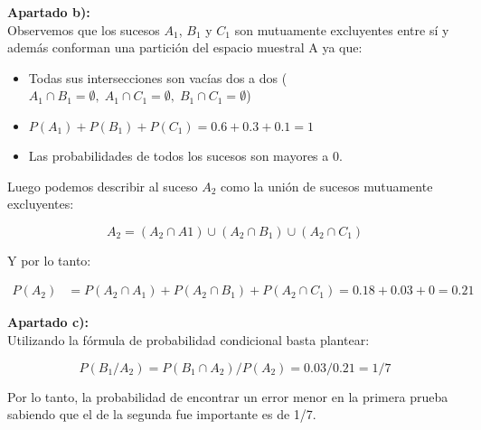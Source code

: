 \documentclass[11pt]{article}
\begin{document}
\begin{justify}
  \textbf{Apartado b):} \\
  Observemos que los sucesos $A_1$, $B_1$ y $C_1$ son mutuamente excluyentes
  entre sí y además conforman una partición del espacio muestral A ya que:
  \begin{itemize}
    \item Todas sus intersecciones son vacías dos a dos
    ($A_1 \cap B_1 = \emptyset,\;A_1 \cap C_1 = \emptyset,\;B_1 \cap C_1 = \emptyset$)
    \item $P(A_1) + P(B_1) + P(C_1) = 0.6 + 0.3 + 0.1 = 1$
    \item Las probabilidades de todos los sucesos son mayores a 0.
  \end{itemize}
  Luego podemos describir al suceso $A_2$ como la unión de sucesos mutuamente
  excluyentes:
\end{justify}
\begin{equation*}
  A_2 = (A_2 \cap A1) \cup (A_2 \cap B_1) \cup (A_2 \cap C_1)
\end{equation*}
\begin{justify}
  Y por lo tanto:
\end{justify}
\begin{align*}
  P(A_2) &= P(A_2 \cap A_1) + P(A_2 \cap B_1) + P(A_2 \cap C_1) 
  = 0.18 + 0.03 + 0 = 0.21
\end{align*}


\begin{justify}
  \textbf{Apartado c):} \\
  Utilizando la fórmula de probabilidad condicional basta plantear:
\end{justify}
\begin{equation*}
  P(B_1/A_2) = P(B_1 \cap A_2) / P(A_2) = 0.03 / 0.21 = 1/7
\end{equation*}
\begin{justify}
  Por lo tanto, la probabilidad de encontrar un error menor en la primera
  prueba sabiendo que el de la segunda fue importante es de 1/7.
\end{justify}

\end{document}
